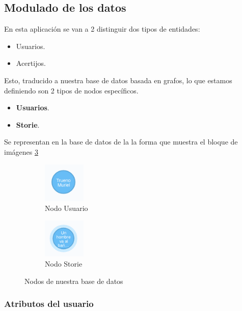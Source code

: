 \subsection{Modulado de los datos}

En esta aplicación se van a 2 distinguir dos tipos de entidades:

\begin{itemize}
    \item  Usuarios.
    \item  Acertijos.
\end{itemize}

Esto, traducido a nuestra base de datos basada en grafos, lo que estamos definiendo son 2 tipos de nodos específicos.

\begin{itemize}
    \item  \textbf{Usuarios}.
    \item  \textbf{Storie}.
\end{itemize}

Se representan en la base de datos de la la forma que muestra el bloque de imágenes \ref{fig::nodos}

\begin{figure}[hbtp] \centering
\begin{subfigure}{.6\textwidth}
     \centerline{\includegraphics[width=2cm]{figuras/usuario.png}}
    \caption{Nodo Usuario} 
    \label{fig::riddle}
\end{subfigure}
\begin{subfigure}{.6\textwidth}
     \centerline{\includegraphics[width=2cm]{figuras/storie.png}}
    \caption{Nodo Storie} 
    \label{fig::solucion}
\end{subfigure}
\caption{Nodos de nuestra base de datos }
\label{fig::nodos}
\end{figure}

\subsubsection{Atributos del usuario}

